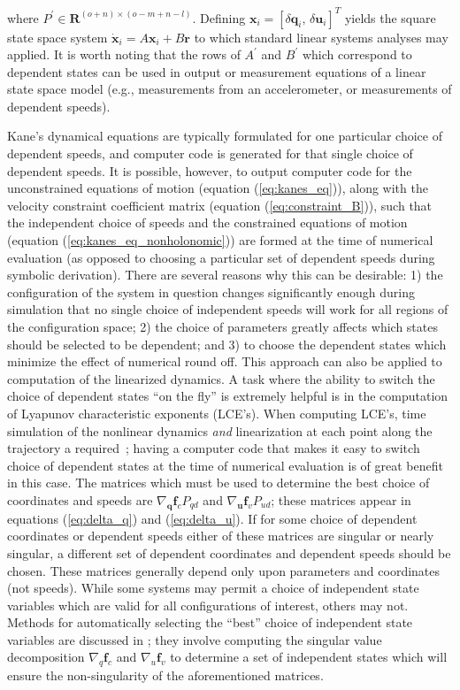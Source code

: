 \documentclass[smallcondensed,final]{svjour3}                     %
\begin{document}
where $P^\prime \in \bm{R}^{(o + n) \times (o - m + n - l)}$.  Defining
$\bm{x}_i = \left[\delta\bm{q}_i,\,\delta\bm{u}_i\right]^{T}$ yields the square
state space system $\dot{\bm{x}}_i = A \bm{x}_i + B \bm{r}$ to which standard
linear systems analyses may applied.  It is worth noting that the rows of
$A^\prime$ and $B^\prime$ which correspond to dependent states can be used in
output or measurement equations of a linear state space model (e.g.,
measurements from an accelerometer, or measurements of dependent speeds).

Kane's dynamical equations are typically formulated for one particular choice
of dependent speeds, and computer code is generated for that single choice of
dependent speeds. It is possible, however, to output computer code for the
unconstrained equations of motion (equation (\ref{eq:kanes_eq})), along with
the velocity constraint coefficient matrix (equation (\ref{eq:constraint_B})),
such that the independent choice of speeds and the constrained equations of
motion (equation (\ref{eq:kanes_eq_nonholonomic})) are formed at the time of
numerical evaluation (as opposed to choosing a particular set of dependent
speeds during symbolic derivation). There are several reasons why this can be
desirable: 1) the configuration of the system in question changes significantly
enough during simulation that no single choice of independent speeds will work
for all regions of the configuration space; 2) the choice of parameters greatly
affects which states should be selected to be dependent; and 3) to choose the
dependent states which minimize the effect of numerical round off. This
approach can also be applied to computation of the linearized dynamics. A task
where the ability to switch the choice of dependent states ``on the fly'' is
extremely helpful is in the computation of Lyapunov characteristic exponents
(LCE's). When computing LCE's, time simulation of the nonlinear dynamics
\textit{and} linearization at each point along the trajectory a
required~\cite{Benettin1980a,Benettin1980b,Udwadia2001};
having a computer code that makes it easy to switch choice of dependent states
at the time of numerical evaluation is of great benefit in this case. The
matrices which must be used to determine the best choice of coordinates and
speeds are $\nabla_{\bm{q}} \bm{f}_c P_{qd}$ and $\nabla_{\bm{u}} \bm{f}_v P_{ud}$;
these matrices appear in equations (\ref{eq:delta_q}) and (\ref{eq:delta_u}).
If for some choice of dependent coordinates or dependent speeds either of these
matrices are singular or nearly singular, a different set of dependent
coordinates and dependent speeds should be chosen. These matrices generally
depend only upon parameters and coordinates (not speeds). While some systems
may permit a choice of independent state variables which are valid for all
configurations of interest, others may not. Methods for automatically selecting
the ``best'' choice of independent state variables are discussed in
\cite{Reckdahl1996}; they involve computing the singular value decomposition
$\nabla_q \bm{f}_c$ and $\nabla_u \bm{f}_v$  to determine a set of independent
states which will ensure the non-singularity of the aforementioned matrices.
\end{document}
